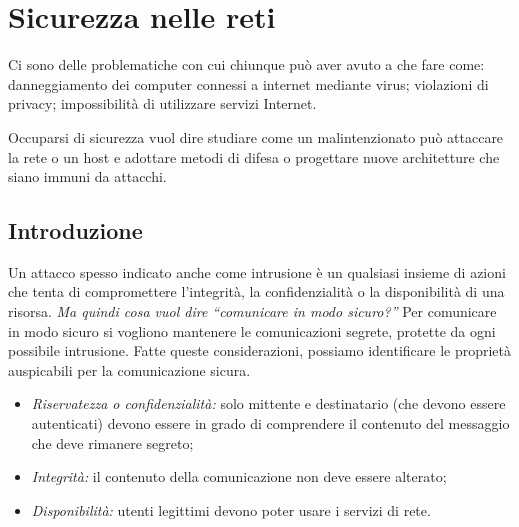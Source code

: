\chapter{Sicurezza nelle reti}
Ci sono delle problematiche con cui chiunque può aver avuto a che fare come: danneggiamento dei computer connessi a internet mediante virus; violazioni di privacy; impossibilità di utilizzare servizi Internet.

\begin{redbar}
    Occuparsi di sicurezza vuol dire studiare come un malintenzionato può attaccare la rete o un host e adottare metodi di difesa o progettare nuove architetture che siano immuni da attacchi.
\end{redbar}

\section{Introduzione}
Un attacco spesso indicato anche come intrusione è un qualsiasi insieme di azioni che tenta di
compromettere l’integrità, la confidenzialità o la disponibilità di una risorsa. \textit{Ma quindi cosa vuol dire “comunicare in modo sicuro?”} Per comunicare in modo sicuro si vogliono mantenere le comunicazioni segrete, protette da ogni possibile intrusione. Fatte queste considerazioni, possiamo identificare le proprietà auspicabili per la comunicazione sicura.
\begin{itemize}
    \item \textit{Riservatezza o confidenzialità:} solo mittente e destinatario (che devono essere autenticati) devono essere in grado di comprendere il contenuto del messaggio che deve rimanere segreto;
    \item \textit{Integrità:} il contenuto della comunicazione non deve essere alterato;
    \item \textit{Disponibilità:} utenti legittimi devono poter usare i servizi di rete.
\end{itemize}

